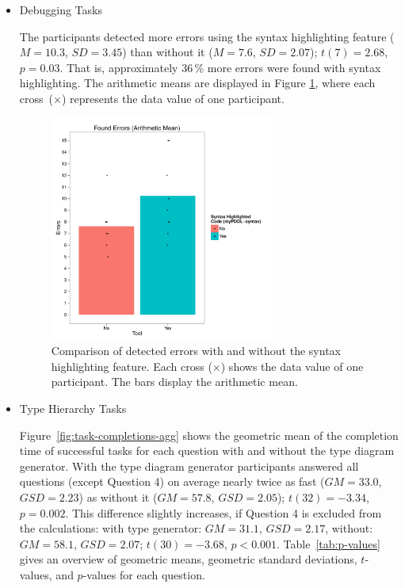 \documentclass[runningheads]{llncs}
\begin{document}
\begin{itemize}
\item Debugging Tasks

  The participants detected more errors using the syntax highlighting
  feature ($M = 10.3$, $SD = 3.45$) than without it ($M = 7.6$,
  $SD = 2.07$); $t(7) = 2.68$, $p = 0.03$.  That is, approximately
  36\,\% more errors were found with syntax highlighting. The
  arithmetic means are displayed in Figure
  \ref{fig:found-errors-combined}, where each cross~($\times$)
  represents the data value of one participant.
\begin{figure}[h]
  \centering
  \hspace{1.7cm}
  \includegraphics[width=0.7\textwidth]{found_errors}
  \caption[Diagram of detected errors]{Comparison of detected errors
    with and without the syntax highlighting feature. Each cross
    ($\times$) shows the data value of one participant. The bars
    display the arithmetic mean.}
\label{fig:found-errors-combined}
\end{figure}

\item Type Hierarchy Tasks

  Figure~\ref{fig:task-completions-agg} shows the geometric mean of
  the completion time of successful tasks for each question with and
  without the type diagram generator. With the type diagram generator
  participants answered all questions (except Question 4) on average
  nearly twice as fast ($GM = 33.0$, $GSD = 2.23$) as without it
  ($GM = 57.8$, $GSD = 2.05$); $t(32) = -3.34$, $p = 0.002$. This
  difference slightly increases, if Question 4 is excluded from the
  calculations: with type generator: $GM = 31.1$, $GSD = 2.17$,
  without: $GM = 58.1$, $GSD = 2.07$; $t(30) = -3.68$, $p < 0.001$.
  Table~\ref{tab:p-values} gives an overview of geometric means,
  geometric standard deviations, $t$-values, and $p$-values for each
  question.


\end{itemize}
\end{document}
